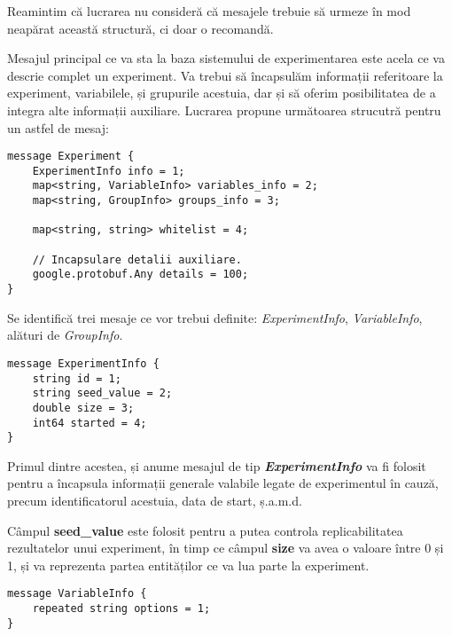 \begin{remark}
	Reamintim că lucrarea nu consideră că mesajele trebuie să urmeze în mod neapărat această structură, ci doar o recomandă.
\end{remark}

Mesajul principal ce va sta la baza sistemului de experimentarea este acela ce va descrie complet un experiment. Va trebui să încapsulăm informații referitoare la experiment, variabilele, și grupurile acestuia, dar și să oferim posibilitatea de a integra alte informații auxiliare. Lucrarea propune următoarea strucutră pentru un astfel de mesaj:

\begin{center}
	\begin{lstlisting}[language=proto3]
message Experiment {
	ExperimentInfo info = 1;
	map<string, VariableInfo> variables_info = 2;
	map<string, GroupInfo> groups_info = 3;
	
	map<string, string> whitelist = 4;
	
	// Incapsulare detalii auxiliare.
	google.protobuf.Any details = 100;
}
	\end{lstlisting}
\end{center}

Se identifică trei mesaje ce vor trebui definite: \textit{ExperimentInfo}, \textit{VariableInfo}, alături de \textit{GroupInfo}.

\break

\begin{center}
	\begin{lstlisting}[language=proto3]
message ExperimentInfo {
	string id = 1;
	string seed_value = 2;
	double size = 3;
	int64 started = 4;
}
	\end{lstlisting}
\end{center}

Primul dintre acestea, și anume mesajul de tip \textbf{\textit{ExperimentInfo}} va fi folosit pentru a încapsula informații generale valabile legate de experimentul în cauză, precum identificatorul acestuia, data de start, ș.a.m.d.

\begin{remark}
	Câmpul \textbf{seed\_value} este folosit pentru a putea controla replicabilitatea rezultatelor unui experiment, în timp ce câmpul \textbf{size} va avea o valoare între 0 și 1, și va reprezenta partea entităților ce va lua parte la experiment.
\end{remark}

\begin{lstlisting}[language=proto3]
message VariableInfo {
	repeated string options = 1;
}
\end{lstlisting}

